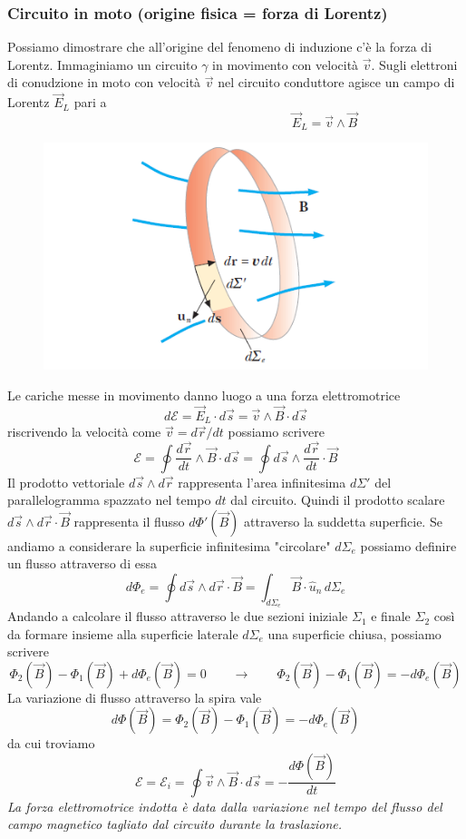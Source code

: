\documentclass[x11names]{report}
\begin{document}
\subsubsection*{Circuito in moto (origine fisica = forza di Lorentz)}
Possiamo dimostrare che all'origine del fenomeno di induzione c'è la forza di Lorentz. Immaginiamo un circuito \(\gamma\) in movimento con velocità \(\vec{v}\). Sugli elettroni di conudzione in moto con velocità \(\vec{v}\) nel circuito conduttore agisce un campo di Lorentz \(\vec{E}_L\) pari a
\[
\qquad\qquad\qquad\qquad\qquad\qquad\qquad\vec{E}_L = \vec{v}\wedge\vec{B}
\]
\begin{figure}
	\vspace{-1cm}
	\includegraphics[scale=0.4]{img/farad_1.png}
\end{figure}
Le cariche messe in movimento danno luogo a una forza elettromotrice
\[
d\mathcal{E} = \vec{E}_L \cdot d\vec{s} = \vec{v}\wedge\vec{B} \cdot d\vec{s}
\]
riscrivendo la velocità come \(\vec{v}=d\vec{r}/dt\) possiamo scrivere
\[
\mathcal{E} = \oint  \frac{d\vec{r}}{dt}\wedge\vec{B}\cdot d\vec{s} = \oint  d\vec{s}\wedge\frac{d\vec{r}}{dt}\cdot \vec{B}
\]
Il prodotto vettoriale \(d\vec{s}\wedge d\vec{r}\) rappresenta l'area infinitesima \(d\Sigma'\) del parallelogramma spazzato nel tempo \(dt\) dal circuito. Quindi il prodotto scalare \(d\vec{s}\wedge d\vec{r}\cdot \vec{B}\) rappresenta il flusso \(d\Phi'(\vec{B})\) attraverso la suddetta superficie. Se andiamo a considerare la superficie infinitesima "circolare" \(d\Sigma_e\) possiamo definire un flusso attraverso di essa
\[
d\Phi_e = \oint d\vec{s}\wedge d\vec{r}\cdot \vec{B} = \int_{d\Sigma_e} \vec{B}\cdot \hat{u}_n \, d\Sigma_e
\]
Andando a calcolare il flusso attraverso le due sezioni iniziale \(\Sigma_1\) e finale \(\Sigma_2\) così da formare insieme alla superficie laterale \(d\Sigma_e\) una superficie chiusa, possiamo scrivere
\[
\Phi_2 (\vec{B})- \Phi_1(\vec{B}) + d\Phi_e(\vec{B}) = 0  \qquad \to \qquad \Phi_2 (\vec{B})- \Phi_1(\vec{B}) =  -d\Phi_e(\vec{B}) 
\]
La variazione di flusso attraverso la spira vale
\[
d\Phi(\vec{B}) = \Phi_2 (\vec{B})- \Phi_1(\vec{B}) = -d\Phi_e(\vec{B}) 
\]
da cui troviamo
\begin{equation}
	\mathcal{E} = \mathcal{E}_i = \oint \vec{v}\wedge\vec{B}\cdot d\vec{s} = -\frac{d\Phi(\vec{B})}{dt}
\end{equation}
\textit{La forza elettromotrice indotta è data dalla variazione nel tempo del flusso del campo magnetico tagliato dal circuito durante la traslazione.}
\end{document}
